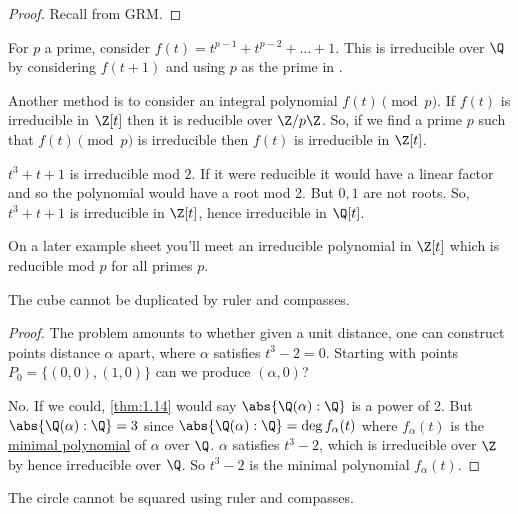 \documentclass{article}
\begin{document}
\begin{proof}
    Recall from GRM.
\end{proof}

\begin{eg}
    For $p$ a prime, consider $f(t) = t^{p-1} + t^{p-2} + \dots + 1$.  This is irreducible over $\Q$ by considering $f(t+1)$ and using $p$ as the prime in .
\end{eg}

Another method is to consider an integral polynomial $f(t) \pmod{p}$. If $f(t)$ is irreducible in $\Z[t]$ then it is reducible over $\Z / p \Z$. So, if we find a prime $p$ such that $f(t) \pmod{p}$ is irreducible then $f(t)$ is irreducible in $\Z[t]$.

\begin{eg}
    $t^3 + t + 1$ is irreducible mod $2$. If it were reducible it would have a linear factor and so the polynomial would have a root mod 2. But $0, 1$ are not roots. So, $t^3 + t + 1$ is irreducible in $\Z[t]$, hence irreducible in $\Q[t]$.
\end{eg}

\begin{remark}
    On a later example sheet you'll meet an irreducible polynomial in $\Z[t]$ which is reducible mod $p$ for all primes $p$.
\end{remark}

\begin{nthm}\label{thm:1.17}
    The cube cannot be duplicated by ruler and compasses.
\end{nthm}

\begin{proof}
    The problem amounts to whether given a unit distance, one can construct points distance $\alpha$ apart, where $\alpha$ satisfies $t^3 - 2 = 0$.
    Starting with points $P_0 = \{(0, 0), (1, 0)\}$ can we produce $(\alpha, 0)$?

    No. If we could, \cref{thm:1.14} would say $\abs{\Q(\alpha):\Q}$ is a power of 2. But $\abs{\Q(\alpha): \Q} = 3$ since $\abs{\Q(\alpha):\Q} = \deg f_\alpha(t)$ where $f_\alpha(t)$ is the \hyperlink{def:minimalPoly}{minimal polynomial} of $\alpha$ over $\Q$. $\alpha$ satisfies $t^3 - 2$, which is irreducible over $\Z$ by  hence irreducible over $\Q$. So $t^3 - 2$ is the minimal polynomial $f_\alpha(t)$.
\end{proof}

\begin{nthm}\label{thm:1.18}
    The circle cannot be squared using ruler and compasses.
\end{nthm}
\end{document}
